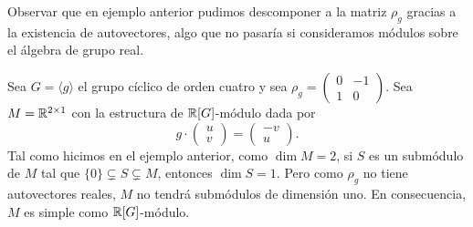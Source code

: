 Observar que en ejemplo anterior pudimos descomponer a la matriz $\rho_g$ 
gracias a la existencia de autovectores, algo 
que no pasaría si consideramos módulos sobre el álgebra de grupo real.   

\begin{example}
Sea $G=\langle g\rangle$ el grupo cíclico de orden cuatro y sea $\rho_g=\begin{pmatrix}
0&-1\\
1&0\end{pmatrix}$. 
Sea $M=\mathbb{R}^{2\times 1}$ con la estructura de $\mathbb{R}[G]$-módulo dada por 
\[
g\cdot\begin{pmatrix}u\\v\end{pmatrix}
=\begin{pmatrix}-v\\u\end{pmatrix}.
\]
Tal como hicimos en el ejemplo anterior, 
como $\dim M=2$, si $S$ es un submódulo de $M$ tal que $\{0\}\subsetneq S\subsetneq M$, entonces $\dim S=1$. 
Pero como $\rho_g$ no tiene autovectores reales, $M$ no tendrá submódulos de dimensión uno.  
En consecuencia, $M$ es simple como $\mathbb{R}[G]$-módulo. 
\end{example}